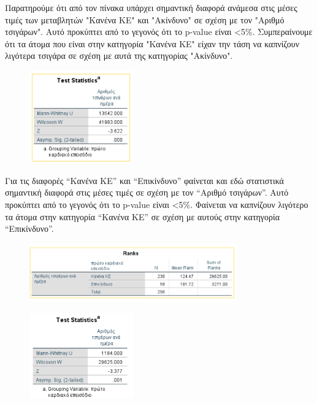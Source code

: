 \vspace{1cm}
Παρατηρούμε ότι από τον πίνακα \textbf{} υπάρχει σημαντική διαφορά ανάμεσα στις μέσες τιμές των μεταβλητών "Κανένα ΚΕ" και "Ακίνδυνο" σε σχέση με τον "Αριθμό τσιγάρων". Αυτό προκύπτει από το γεγονός ότι το p-value είναι <5\%. Συμπεραίνουμε  ότι τα άτομα που είναι στην κατηγορία "Κανένα ΚΕ"  είχαν την τάση να καπνίζουν λιγότερα τσιγάρα σε σχέση με αυτά της κατηγορίας "Ακίνδυνο".

\clearpage

\begin{figure}[ht]
    \centering
    \includegraphics[width=0.4\textwidth]{images/205.PNG}
\end{figure}

Για τις διαφορές “Κανένα ΚΕ” και “Επικίνδυνο” φαίνεται και εδώ στατιστικά σημαντική διαφορά στις μέσες τιμές σε σχέση με τον “Αριθμό τσιγάρων”. Αυτό προκύπτει από το γεγονός ότι το p-value είναι <5\%. Φαίνεται να καπνίζουν λιγότερο τα άτομα στην κατηγορία “Κανένα ΚΕ” σε σχέση με αυτούς στην κατηγορία “Επικίνδυνο”.

\vspace{1cm}

\begin{figure}[h]
    \centering
    \includegraphics[width=0.8\textwidth]{images/206.PNG}
\end{figure}

\vspace{1cm}

\begin{figure}[h]
    \centering
    \includegraphics[width=0.4\textwidth]{images/207.PNG}
\end{figure}

